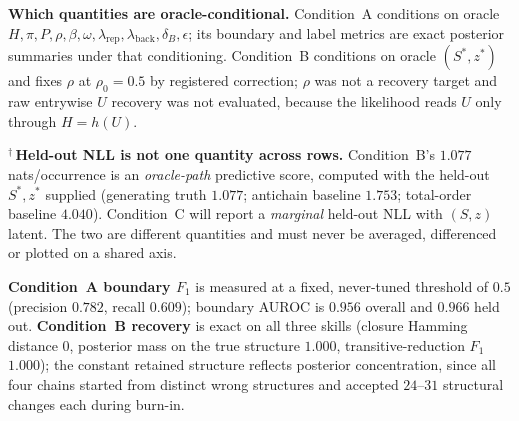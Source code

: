 \begin{table}[t]
\begin{minipage}{\linewidth}
\textbf{Which quantities are oracle-conditional.}
Condition~A conditions on oracle $H, \pi, P, \rho, \beta, \omega,
\lambda_{\mathrm{rep}}, \lambda_{\mathrm{back}}, \delta_B, \epsilon$; its
boundary and label metrics are exact posterior summaries under that
conditioning.
Condition~B conditions on oracle $(S^\ast, z^\ast)$ and fixes $\rho$ at
$\rho_0 = 0.5$ by registered correction; $\rho$ was not a recovery target and
raw entrywise $U$ recovery was not evaluated, because the likelihood reads $U$
only through $H = h(U)$.

$^{\dagger}$\,\textbf{Held-out NLL is not one quantity across rows.}
Condition~B's $1.077$ nats/occurrence is an \emph{oracle-path} predictive score,
computed with the held-out $S^\ast, z^\ast$ supplied (generating truth
$1.077$; antichain baseline $1.753$; total-order baseline $4.040$). Condition~C
will report a \emph{marginal} held-out NLL with $(S,z)$ latent. The two are
different quantities and must never be averaged, differenced or plotted on a
shared axis.

\textbf{Condition~A boundary $F_1$} is measured at a fixed, never-tuned
threshold of $0.5$ (precision $0.782$, recall $0.609$); boundary AUROC is
$0.956$ overall and $0.966$ held out.
\textbf{Condition~B recovery} is exact on all three skills (closure Hamming
distance $0$, posterior mass on the true structure $1.000$, transitive-reduction
$F_1$ $1.000$); the constant retained structure reflects posterior
concentration, since all four chains started from distinct wrong structures and
accepted $24$--$31$ structural changes each during burn-in.
\end{minipage}
\end{table}
